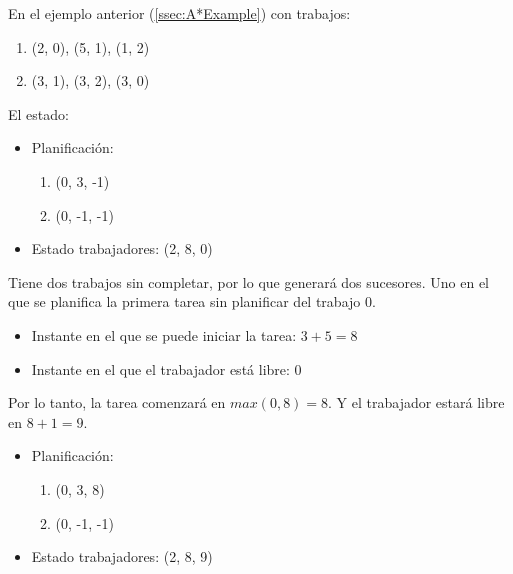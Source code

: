 \begin{examplebox}
    En el ejemplo anterior (\ref{ssec:A*Example}) con trabajos:
    \begin{enumerate}[start=0, itemsep=0.25px]
        \item (2, 0), (5, 1), (1, 2)
        \item (3, 1), (3, 2), (3, 0)
    \end{enumerate}
    El estado:
    \begin{itemize}[itemsep=0.25px]
        \item Planificación:
        \begin{enumerate}[start=0, itemsep=0.25px]
            \item (0, 3, -1)
            \item (0, -1, -1)
        \end{enumerate}
        \item Estado trabajadores: (2, 8, 0)
    \end{itemize}
    Tiene dos trabajos sin completar, por lo que generará dos sucesores.
    Uno en el que se planifica la primera tarea sin planificar del trabajo 0.
    \begin{itemize}[itemsep=0.25px]
        \item Instante en el que se puede iniciar la tarea: $3 + 5 = 8$
        \item Instante en el que el trabajador está libre: $0$
    \end{itemize}
    Por lo tanto, la tarea comenzará en $max(0, 8) = 8$.
    Y el trabajador estará libre en $8 + 1 = 9$.
    \begin{itemize}[itemsep=0.25px]
        \item Planificación:
        \begin{enumerate}[start=0, itemsep=0.25px]
            \item (0, 3, 8)
            \item (0, -1, -1)
        \end{enumerate}
        \item Estado trabajadores: (2, 8, 9)
    \end{itemize}


\end{examplebox}
